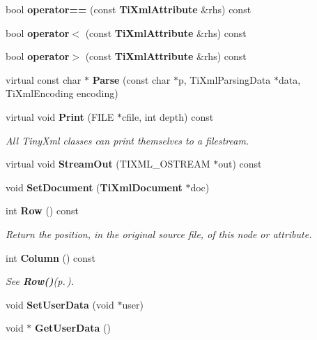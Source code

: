 \begin{CompactItemize}
\item 
bool {\bf operator==} (const {\bf Ti\-Xml\-Attribute} \&rhs) const\label{classTiXmlAttribute_TiXmlAttributea19}

\item 
bool {\bf operator$<$} (const {\bf Ti\-Xml\-Attribute} \&rhs) const\label{classTiXmlAttribute_TiXmlAttributea20}

\item 
bool {\bf operator$>$} (const {\bf Ti\-Xml\-Attribute} \&rhs) const\label{classTiXmlAttribute_TiXmlAttributea21}

\item 
virtual const char $\ast$ {\bf Parse} (const char $\ast$p, Ti\-Xml\-Parsing\-Data $\ast$data, Ti\-Xml\-Encoding encoding)\label{classTiXmlAttribute_TiXmlAttributea22}

\item 
virtual void {\bf Print} (FILE $\ast$cfile, int depth) const
\begin{CompactList}\small\item\em All Tiny\-Xml classes can print themselves to a filestream. \item\end{CompactList}\item 
virtual void {\bf Stream\-Out} (TIXML\_\-OSTREAM $\ast$out) const\label{classTiXmlAttribute_TiXmlAttributea24}

\item 
void {\bf Set\-Document} ({\bf Ti\-Xml\-Document} $\ast$doc)\label{classTiXmlAttribute_TiXmlAttributea25}

\item 
int {\bf Row} () const
\begin{CompactList}\small\item\em Return the position, in the original source file, of this node or attribute. \item\end{CompactList}\item 
int {\bf Column} () const\label{classTiXmlBase_TiXmlUnknowna79}

\begin{CompactList}\small\item\em See {\bf Row()}{\rm (p.\,\pageref{classTiXmlBase_TiXmlUnknowna78})}. \item\end{CompactList}\item 
void {\bf Set\-User\-Data} (void $\ast$user)\label{classTiXmlBase_TiXmlUnknowna80}

\item 
void $\ast$ {\bf Get\-User\-Data} ()\label{classTiXmlBase_TiXmlUnknowna81}

\end{CompactItemize}
